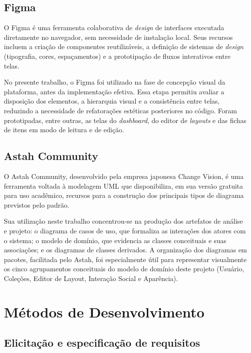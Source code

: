 \subsection{Figma}

O Figma é uma ferramenta colaborativa de \textit{design} de interfaces executada diretamente no navegador, sem necessidade de instalação local. Seus recursos incluem a criação de componentes reutilizáveis, a definição de sistemas de \textit{design} (tipografia, cores, espaçamentos) e a prototipação de fluxos interativos entre telas.

No presente trabalho, o Figma foi utilizado na fase de concepção visual da plataforma, antes da implementação efetiva. Essa etapa permitiu avaliar a disposição dos elementos, a hierarquia visual e a consistência entre telas, reduzindo a necessidade de refatorações estéticas posteriores no código. Foram prototipadas, entre outras, as telas do \textit{dashboard}, do editor de \textit{layouts} e das fichas de itens em modo de leitura e de edição.

\subsection{Astah Community}

O Astah Community, desenvolvido pela empresa japonesa Change Vision, é uma ferramenta voltada à modelagem UML que disponibiliza, em sua versão gratuita para uso acadêmico, recursos para a construção dos principais tipos de diagrama previstos pelo padrão.

Sua utilização neste trabalho concentrou-se na produção dos artefatos de análise e projeto: o diagrama de casos de uso, que formaliza as interações dos atores com o sistema; o modelo de domínio, que evidencia as classes conceituais e suas associações; e os diagramas de classes derivados. A organização dos diagramas em pacotes, facilitada pelo Astah, foi especialmente útil para representar visualmente os cinco agrupamentos conceituais do modelo de domínio deste projeto (Usuário, Coleções, Editor de Layout, Interação Social e Aparência).

\section{Métodos de Desenvolvimento}

\subsection{Elicitação e especificação de requisitos}

